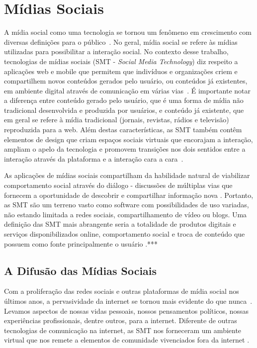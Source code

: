 \chapter{Mídias Sociais}
\label{cap:midias-sociais}



A mídia social como uma tecnologia se tornou um fenômeno em crescimento com
diversas definições para o público~\cite{davis2012}. No geral, mídia social
se refere às mídias utilizadas para possibilitar a interação social. No contexto
desse trabalho, tecnologias de mídias sociais (SMT - \textit{Social Media Technology})
diz respeito a aplicações web e mobile que permitem que indivíduos e organizações
criem e compartilhem novos conteúdos gerados pelo usuário, ou conteúdos já
existentes, em ambiente digital através de comunicação em várias vias~\cite{davis2012}. É
importante notar a diferença entre conteúdo gerado pelo usuário, que é uma forma
de mídia não tradicional desenvolvida e produzida por usuários, e conteúdo já
existente, que em geral se refere à mídia tradicional (jornais, revistas, rádios
e televisão) reproduzida para a web. Além destas características, as SMT também
contêm elementos de design que criam espaços sociais virtuais que encorajam a 
interação, ampliam o apelo da tecnologia e promovem transições nos dois sentidos
entre a interação através da plataforma e a interação cara a cara~\cite{davis2012}.

As aplicações de mídias sociais compartilham da habilidade natural de viabilizar
comportamento social através do diálogo - discussões de múltiplas vias que
fornecem a oportunidade de descobrir e compartilhar informação nova
\cite{solis2008}.
%
Portanto, as SMT são um terreno vasto como software com possibilidades de uso
variadas, não estando limitada a redes sociais, compartilhamento de vídeo ou
blogs. Uma definição das SMT mais abrangente seria a totalidade de produtos
digitais e serviços disponibilizados online, comportamento social e troca de
conteúdo que possuem como fonte principalmente o usuário \cite{???}.***

\section{A Difusão das Mídias Sociais}

Com a proliferação das redes sociais e outras plataformas de mídia social nos
últimos anos, a pervasividade da internet se tornou mais evidente do que nunca~\cite{davis2012}.
%
Levamos aspectos de nossas vidas pessoais, nossos pensamentos políticos, nossas
experiências profissionais, dentre outros, para a internet. Diferente de outras
tecnologias de comunicação na internet, as SMT nos forneceram um ambiente
virtual que nos remete a elementos de comunidade vivenciados fora da internet
\cite{davis2012}.

